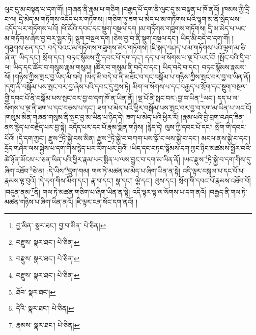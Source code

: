 ལུང་དུ་མ་བསྟན་པ་དག་གོ། །གཞན་ནི་རྣམ་པ་གཅིག །བརྒྱད་པོ་དག་ནི་ལུང་དུ་མ་བསྟན་པ་ཁོ་ནའོ། །ཁམས་ཀྱི་དྲི་བ་ལ། དྲི་མེད་མ་གཏོགས་འདོད་པར་གཏོགས། །གཅིག་ཏུ་ཟག་པ་མེད་པ་མ་གཏོགས་པའི་ལྷག་མ་ནི་སྲིད་པས་འདོད་པར་གཏོགས་པའོ། །ཕོ་མོའི་དབང་དང་སྡུག་བསྔལ་དག །མ་གཏོགས་གཟུགས་གཏོགས། དྲི་མ་མེད་པ་ཡང་མ་གཏོགས་ཞེས་བྱ་བར་སྦྱར་ཏེ། སྡུག་བསྔལ་དག །ཅེས་བྱ་བ་ནི་སྡུག་བསྔལ་དང་། ཡིད་མི་བདེ་བ་དག་གོ། །གཟུགས་ཅན་དང་། བདེ་བའང་མ་གཏོགས་གཟུགས་མེད་གཏོགས། །ཇི་སྐད་བཤད་པ་མ་གཏོགས་པའི་ལྷག་མ་ཅི་ཞེ་ན། ཡིད་དང་། སྲོག་དང་། བཏང་སྙོམས་ཀྱི་དབང་པོ་དག་དང་། དད་པ་ལ་སོགས་པ་ལྔ་པོ་ཡང་ངོ། །སྤོང་བའི་དྲི་བ་ལ། ཡིད་དང་ཚོར་བ་གསུམ་རྣམ་གསུམ། །ཚོར་བ་གསུམ་ནི་བདེ་བ་དང་། ཡིད་བདེ་བ་དང་། བཏང་སྙོམས་རྣམས་སོ། །གཉིས་ཀྱིས་སྤང་བྱ་ཡིད་མི་བདེ། །ཡིད་མི་བདེ་བ་ནི་མཐོང་བ་དང་བསྒོམ་པ་གཉིས་ཀྱིས་སྤང་བར་བྱ་བ་ཡིན་ནོ། །དགུ་ནི་བསྒོམ་པས་སྤང་བར་བྱ་ཞེས་པའི་དབང་དུ་བྱས་ཏེ། མིག་ལ་སོགས་པ་དང་བརྒྱད་པ་སྲོག་དང་སྡུག་བསྔལ་གྱི་དབང་པོ་ནི་བསྒོམ་པས་སྤང་བར་བྱ་བ་དག་ཁོ་ན་ཡིན་ནོ། །ལྔ་པོ་ནི་སྤང་བར་:བྱ་བ་ཡིན་\footnote{བྱ་མིན་  སྣར་ཐང་། བྱ་བ་མིན་  པེ་ཅིན། }ཡང་། དད་པ་ལ་སོགས་པ་ལྔ་ནི་ཟག་པ་དང་བཅས་པ་དང་། ཟག་པ་མེད་པའི་ཕྱིར་བསྒོམ་པས་སྤང་བར་བྱ་བ་དག་མ་ཡིན་པ་ཡང་ངོ། །གསུམ་མིན་གཞན་གསུམ་ནི་སྤང་བྱ་མ་ཡིན་པ་ཉིད་དེ། ཟག་པ་མེད་པའི་ཕྱིར་རོ། །རྣམ་པའི་བྱེ་བྲག་བཤད་ཟིན་ནས་རྙེད་པ་བརྗོད་པར་བྱ་སྟེ། འདོད་པར་དང་པོ་རྣམ་སྨིན་གཉིས། །རྙེད་དེ། ལུས་ཀྱི་དབང་པོ་དང་། སྲོག་གི་དབང་པོའོ། །དེ་དག་ཀྱང་། རྫུས་\footnote{བརྫུས་  སྣར་ཐང་།  པེ་ཅིན། }ཏེ་སྐྱེ་བས་མིན། རྫུས་\footnote{བརྫུས་  སྣར་ཐང་།  པེ་ཅིན། }ཏེ་སྐྱེ་བ་བཀག་པས་སྒོ་ང་ལས་སྐྱེ་བ་དང་། མངལ་ནས་སྐྱེ་བ་དང་། དྲོད་གཤེར་ལས་སྐྱེས་པ་དག་གིས་རྙེད་པར་རིག་པར་བྱའོ། །ཡིད་དང་བཏང་སྙོམས་དག་ཀྱང་ཉིང་མཚམས་སྦྱོར་བའི་ཚེ་ཉོན་མོངས་པ་ཅན་ཡིན་པའི་ཕྱིར་རྣམ་པར་སྨིན་པ་ལས་བྱུང་བ་དག་མ་ཡིན་ནོ། །ཡང་རྫུས་\footnote{བརྫུས་  སྣར་ཐང་།  པེ་ཅིན། }ཏེ་སྐྱེ་བ་དག་གིས་དུ་ཞིག་འཐོབ་\footnote{ཐོབ་  སྣར་ཐང་། }ཅེ་ན། :དེ་ཡིས་\footnote{དེའི་  སྣར་ཐང་།  པེ་ཅིན། }དྲུག་གམ། གལ་ཏེ་མཚན་མ་མེད་པ་ཞིག་ཡིན་ན་སྟེ། འདི་ལྟར་བསྐལ་པ་དང་པོ་པ་རྣམས་ལྟ་བུའོ། །དེ་དག་གིས་མིག་དང་། རྣ་བ་དང་། སྣ་དང་། ལྕེ་དང་། ལུས་དང་། སྲོག་གི་དབང་པོ་རྣམས་འཐོབ་བོ། །བདུན་ནམ་\footnote{རྣམས་  སྣར་ཐང་།  པེ་ཅིན། }ནི། གལ་ཏེ་མཚན་གཅིག་པ་ཞིག་ཡིན་ན་སྟེ། འདི་ལྟར་ལྟ་ལ་སོགས་པ་དག་ནའོ། །བརྒྱད་ནི་གལ་ཏེ་མཚན་གཉིས་པ་ཞིག་ཡིན་ནའོ། །ཇི་ལྟར་ངན་སོང་དག་ནའོ། །
